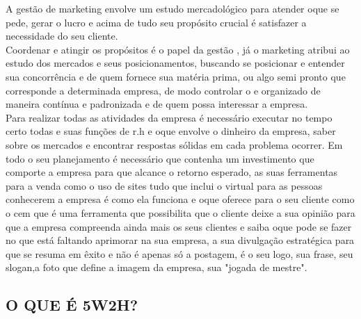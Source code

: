 \documentclass[a4paper,12pt]{article}
\begin{document}
   A gestão de marketing envolve um estudo mercadológico para atender oque se pede, gerar o lucro e acima de tudo seu propósito crucial é satisfazer a necessidade do seu cliente.\\
   Coordenar e atingir os propósitos é o papel da gestão , já o marketing atribui ao estudo dos mercados e seus posicionamentos, buscando se posicionar e entender sua concorrência e de quem fornece sua matéria prima, ou algo semi pronto que corresponde a determinada empresa, de modo controlar o e organizado de maneira contínua e padronizada e de quem possa interessar a empresa.\\
   Para realizar todas as atividades da empresa é necessário executar no tempo certo todas e suas funções de r.h e oque envolve o dinheiro da empresa, saber sobre os mercados e encontrar respostas sólidas em cada problema ocorrer.
   Em todo o seu planejamento é necessário que contenha um investimento que comporte a empresa para que alcance o retorno esperado, as suas ferramentas para a venda como o uso de sites tudo que inclui o virtual para as pessoas conhecerem a empresa é como ela funciona e oque oferece para o seu cliente como o cem que é uma ferramenta que possibilita que o cliente deixe a sua opinião para que a empresa compreenda ainda mais os seus clientes e saiba oque pode se fazer no que está faltando aprimorar na sua empresa, a sua divulgação estratégica para que se resuma em êxito e não é apenas só a postagem, é o seu logo, sua frase, seu slogan,a foto que define a imagem da empresa, sua "jogada de mestre".

   \subsection{O QUE É 5W2H?}
\end{document}
